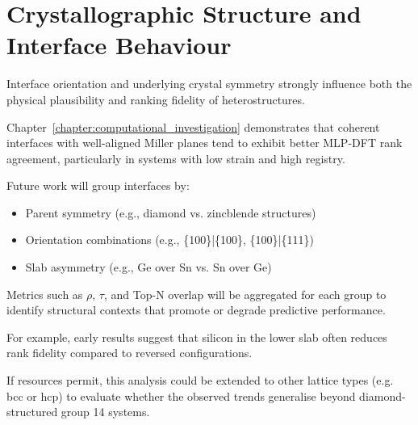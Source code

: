 \section{Crystallographic Structure and Interface Behaviour}


Interface orientation and underlying crystal symmetry strongly influence both the physical plausibility and ranking
fidelity of heterostructures.

Chapter~\ref{chapter:computational_investigation} demonstrates that coherent interfaces with well-aligned Miller planes
tend to exhibit better MLP-DFT rank agreement, particularly in systems with low strain and high registry.


Future work will group interfaces by:


\begin{itemize}
    \item Parent symmetry (e.g., diamond vs. zincblende structures)
    \item Orientation combinations (e.g., \{100\}|\{100\}, \{100\}|\{111\})
    \item Slab asymmetry (e.g., Ge over Sn vs. Sn over Ge)
\end{itemize}


Metrics such as \( \rho \), \( \tau \), and Top-N overlap will be aggregated for each group to identify structural
contexts that promote or degrade predictive performance.

For example, early results suggest that silicon in the lower slab often reduces rank fidelity compared to reversed
configurations.


If resources permit, this analysis could be extended to other lattice types (e.g. bcc or hcp) to evaluate whether the
observed trends generalise beyond diamond-structured group 14 systems.

